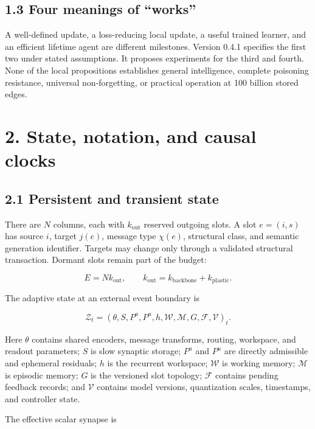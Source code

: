 \documentclass[
  11pt,
  a4paper,
]{article}
\begin{document}
\subsection{1.3 Four meanings of
``works''}\label{four-meanings-of-works}

A well-defined update, a loss-reducing local update, a useful trained
learner, and an efficient lifetime agent are different milestones.
Version 0.4.1 specifies the first two under stated assumptions. It
proposes experiments for the third and fourth. None of the local
propositions establishes general intelligence, complete poisoning
resistance, universal non-forgetting, or practical operation at 100
billion stored edges.

\section{2. State, notation, and causal
clocks}\label{state-notation-and-causal-clocks}

\subsection{2.1 Persistent and transient
state}\label{persistent-and-transient-state}

There are \(N\) columns, each with \(k_{\mathrm{out}}\) reserved
outgoing slots. A slot \(e=(i,s)\) has source \(i\), target \(j(e)\),
message type \(\chi(e)\), structural class, and semantic generation
identifier. Targets may change only through a validated structural
transaction. Dormant slots remain part of the budget:

\[
E=N k_{\mathrm{out}},\qquad
k_{\mathrm{out}}=k_{\mathrm{backbone}}+k_{\mathrm{plastic}}.
\tag{1}
\]

The adaptive state at an external event boundary is

\[
\mathcal Z_t=
(\theta,S,P^a,P^u,h,\mathcal W,\mathcal M,
 G,\mathcal F,\mathcal V)_t.
\tag{2}
\]

Here \(\theta\) contains shared encoders, message transforms, routing,
workspace, and readout parameters; \(S\) is slow synaptic storage;
\(P^a\) and \(P^u\) are directly admissible and ephemeral residuals;
\(h\) is the recurrent workspace; \(\mathcal W\) is working memory;
\(\mathcal M\) is episodic memory; \(G\) is the versioned slot topology;
\(\mathcal F\) contains pending feedback records; and \(\mathcal V\)
contains model versions, quantization scales, timestamps, and controller
state.

The effective scalar synapse is
\end{document}
